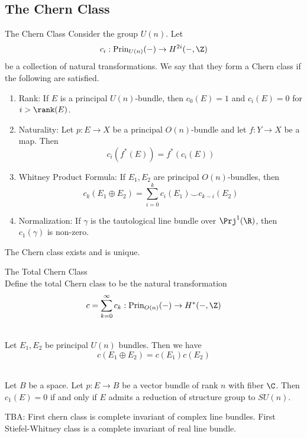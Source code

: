 \documentclass[a4paper]{article}
\begin{document}
\subsection{The Chern Class}
\begin{defn}{The Chern Class}{} Consider the group $U(n)$. Let $$c_i:\text{Prin}_{U(n)}(-)\to H^{2i}(-,\Z)$$ be a collection of natural transformations. We say that they form a Chern class if the following are satisfied. 
\begin{enumerate}
\item Rank: If $E$ is a principal $U(n)$-bundle, then $c_0(E)=1$ and $c_i(E)=0$ for $i>\rank(E)$. 
\item Naturality: Let $p:E\to X$ be a principal $O(n)$-bundle and let $f:Y\to X$ be a map. Then $$c_i(f^\ast(E))=f^\ast(c_i(E))$$
\item Whitney Product Formula: If $E_1,E_2$ are principal $O(n)$-bundles, then $$c_k(E_1\oplus E_2)=\sum_{i=0}^kc_i(E_1)\smile c_{k-i}(E_2)$$
\item Normalization: If $\gamma$ is the tautological line bundle over $\Prj^1(\R)$, then $c_1(\gamma)$ is non-zero. 
\end{enumerate}
\end{defn}

\begin{prp}{}{} The Chern class exists and is unique. 
\end{prp}

\begin{defn}{The Total Chern Class}{}\\
Define the total Chern class to be the natural transformation $$c=\sum_{k=0}^\infty c_k:\text{Prin}_{O(n)}(-)\to H^\ast(-,\Z)$$
\end{defn}

\begin{lmm}{}{}\\
Let $E_1,E_2$ be principal $U(n)$ bundles. Then we have $$c(E_1\oplus E_2)=c(E_1)c(E_2)$$
\end{lmm}

\begin{prp}{}{}\\
Let $B$ be a space. Let $p:E\to B$ be a vector bundle of rank $n$ with fiber $\C$. Then $c_1(E)=0$ if and only if $E$ admits a reduction of structure group to $SU(n)$. 
\end{prp}

TBA: First chern class is complete invariant of complex line bundles. First Stiefel-Whitney class is a complete invariant of real line bundle. 
\end{document}
